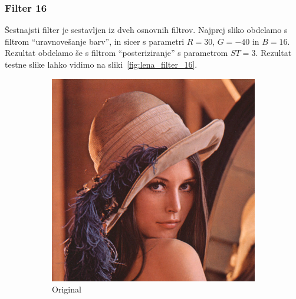 \documentclass[a4paper, 12pt]{book}
\begin{document}
\subsubsection*{Filter 16}
Šestnajsti filter je sestavljen iz dveh osnovnih filtrov. Najprej sliko obdelamo s
filtrom ``uravnovešanje barv'', in sicer s parametri $R = 30$, $G = -40$ in
$B = 16$. Rezultat obdelamo še s filtrom ``posteriziranje'' s parametrom
$ST =3$. Rezultat testne slike lahko vidimo na sliki~\ref{fig:lena_filter_16}.

\begin{figure}[!ht]
    \centering
    \begin{subfigure}[b]{0.4\textwidth}
        \includegraphics[width=\textwidth]{lena}
        \caption{Original}
    \end{subfigure}
    \begin{subfigure}[b]{0.4\textwidth}

\end{subfigure}
\end{figure}
\end{document}
